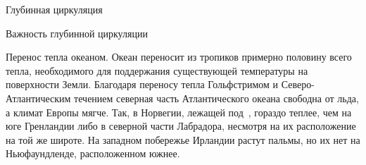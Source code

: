 \begin{chapter}{Глубинная циркуляция}
\begin{section}{Важность глубинной циркуляции}
\begin{paragraph}{Перенос тепла океаном.}
Океан переносит
из тропиков примерно половину всего тепла, необходимого для поддержания
существующей температуры на поверхности Земли. Благодаря переносу тепла 
Гольфстримом и Северо-Атлантическим течением
северная часть Атлантического океана свободна от льда, а климат Европы
мягче. Так, в Норвегии, лежащей под~, гораздо теплее, чем
на юге Гренландии либо в северной части Лабрадора, несмотря на их 
расположение на той же широте. На западном побережье Ирландии растут
пальмы, но их нет на Ньюфаундленде, расположенном южнее.
%


\end{paragraph}
\end{section}
\end{chapter}
